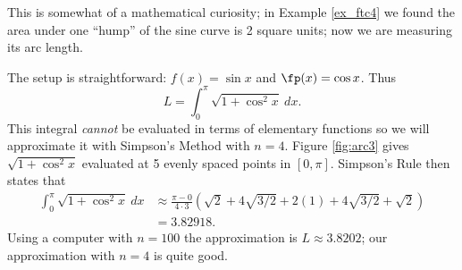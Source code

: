 \begin{solution}
{This is somewhat of a mathematical curiosity; in Example \ref{ex_ftc4} we found the area under one ``hump'' of the sine curve is 2 square units; now we are measuring its arc length.

The setup is straightforward: $f(x) = \sin x$ and $\fp(x) = \cos x$. Thus 
$$L = \int_0^\pi \sqrt{1+\cos^2x}\ dx.$$
This integral \textit{cannot} be evaluated in terms of elementary functions so we will approximate it with Simpson's Method with $n=4$. 
Figure \ref{fig:arc3} gives $\sqrt{1+\cos^2x}$ evaluated at 5 evenly spaced points in $[0,\pi]$. Simpson's Rule then states that 
\begin{align*}
\int_0^\pi \sqrt{1+\cos^2x}\ dx &\approx	\frac{\pi-0}{4\cdot 3}\left(\sqrt{2}+4\sqrt{3/2}+2(1)+4\sqrt{3/2}+\sqrt{2}\right) \\
			&=3.82918.
\end{align*}
Using a computer with $n=100$ the approximation is $L\approx 3.8202$; our approximation with $n=4$ is quite good.
}
\end{solution}























